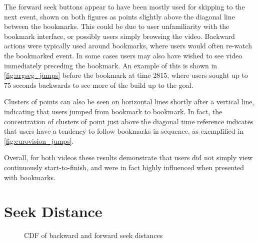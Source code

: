 The forward seek buttons appear to have been mostly used for skipping to the next event, shown on both figures as points slightly above the diagonal line between the bookmarks. This could be due to user unfamiliarity with the bookmark interface, or possibly users simply browsing the video. Backward actions were typically used around bookmarks, where users would often re-watch the bookmarked event. In some cases users may also have wished to see video immediately preceding the bookmark. An example of this is shown in \autoref{fig:argscg_jumps} before the bookmark at time 2815, where users sought up to 75 seconds backwards to see more of the build up to the goal.

Clusters of points can also be seen on horizontal lines shortly after a vertical line, indicating that users jumped from bookmark to bookmark. In fact, the concentration of clusters of point just above the diagonal time reference indicates that users have a tendency to follow bookmarks in sequence, as exemplified in \autoref{fig:eurovision_jumps}.

Overall, for both videos these results demonstrate that users did not simply view continuously start-to-finish, and were in fact highly influenced when presented with bookmarks.

\section{Seek Distance}
\label{sect:seek_distance}

\begin{figure}[t]
    \centering


    \caption{CDF of backward and forward seek distances}
    \label{fig:seek_distance}
\end{figure}

